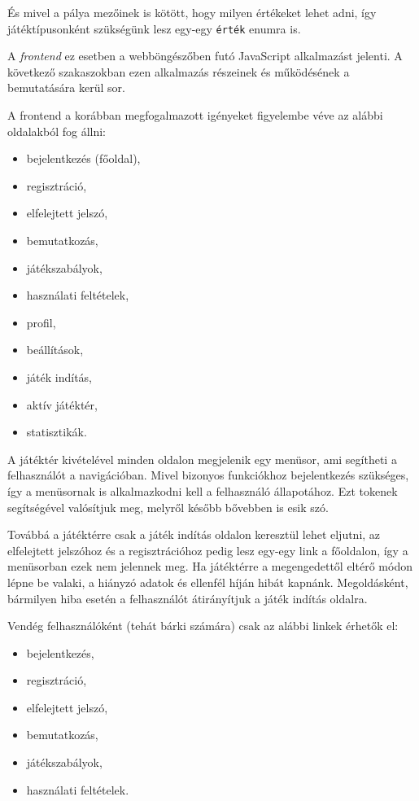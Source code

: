 És mivel a pálya mezőinek is kötött, hogy milyen értékeket lehet adni, így játéktípusonként szükségünk lesz egy-egy \texttt{érték} enumra is.


A \textit{frontend} ez esetben a webböngészőben futó JavaScript alkalmazást jelenti. A következő szakaszokban ezen alkalmazás részeinek és működésének a bemutatására kerül sor.

A frontend a korábban megfogalmazott igényeket figyelembe véve az alábbi oldalakból fog állni:
\begin{itemize}
	\item bejelentkezés (főoldal),
	\item regisztráció,
	\item elfelejtett jelszó,
	\item bemutatkozás,
	\item játékszabályok,
	\item használati feltételek,
	\item profil,
	\item beállítások,
	\item játék indítás,
	\item aktív játéktér,
	\item statisztikák.
\end{itemize}
A játéktér kivételével minden oldalon megjelenik egy menüsor, ami segítheti a felhasználót a navigációban. Mivel bizonyos funkciókhoz bejelentkezés szükséges, így a menüsornak is alkalmazkodni kell a felhasználó állapotához. Ezt tokenek segítségével valósítjuk meg, melyről később bővebben is esik szó.

Továbbá a játéktérre csak a játék indítás oldalon keresztül lehet eljutni, az elfelejtett jelszóhoz és a regisztrációhoz pedig lesz egy-egy link a főoldalon, így a menüsorban ezek nem jelennek meg. Ha játéktérre a megengedettől eltérő módon lépne be valaki, a hiányzó adatok és ellenfél híján hibát kapnánk. Megoldásként, bármilyen hiba esetén a felhasználót átirányítjuk a játék indítás oldalra.

Vendég felhasználóként (tehát bárki számára) csak az alábbi linkek érhetők el:
\begin{itemize}
	\item bejelentkezés,
	\item regisztráció,
	\item elfelejtett jelszó,
	\item bemutatkozás,
	\item játékszabályok,
	\item használati feltételek.
\end{itemize}

